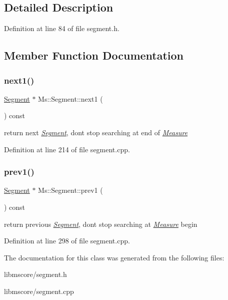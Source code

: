 \subsection{Detailed Description}


Definition at line 84 of file segment.\+h.



\subsection{Member Function Documentation}
\mbox{\label{class_ms_1_1_segment_a8c27ddfb0004417dd89b655e3480a6a0}} 
\subsubsection{\texorpdfstring{next1()}{next1()}}
{\footnotesize\ttfamily \hyperlink{class_ms_1_1_segment}{Segment} $\ast$ Ms\+::\+Segment\+::next1 (\begin{DoxyParamCaption}{ }\end{DoxyParamCaption}) const}

return next {\itshape \hyperlink{class_ms_1_1_segment}{Segment}}, dont stop searching at end of {\itshape \hyperlink{class_ms_1_1_measure}{Measure}} 

Definition at line 214 of file segment.\+cpp.

\mbox{\label{class_ms_1_1_segment_a07a0b52e5f58941bd85ca307455e62c6}} 
\subsubsection{\texorpdfstring{prev1()}{prev1()}}
{\footnotesize\ttfamily \hyperlink{class_ms_1_1_segment}{Segment} $\ast$ Ms\+::\+Segment\+::prev1 (\begin{DoxyParamCaption}{ }\end{DoxyParamCaption}) const}

return previous {\itshape \hyperlink{class_ms_1_1_segment}{Segment}}, dont stop searching at {\itshape \hyperlink{class_ms_1_1_measure}{Measure}} begin 

Definition at line 298 of file segment.\+cpp.



The documentation for this class was generated from the following files\+:\begin{DoxyCompactItemize}
\item 
libmscore/segment.\+h\item 
libmscore/segment.\+cpp\end{DoxyCompactItemize}
